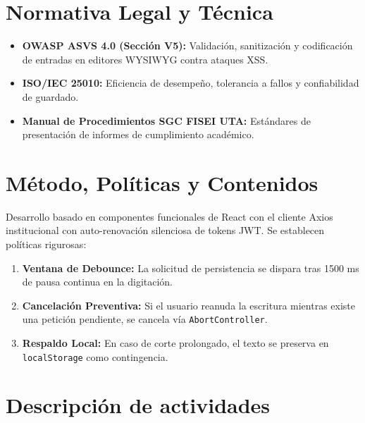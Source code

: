 \documentclass[12pt,a4paper]{article}
\begin{document}
\section{Normativa Legal y Técnica}
\begin{itemize}[leftmargin=1.5em, itemsep=2pt]
    \item \textbf{OWASP ASVS 4.0 (Sección V5):} Validación, sanitización y codificación de entradas en editores WYSIWYG contra ataques XSS.
    \item \textbf{ISO/IEC 25010:} Eficiencia de desempeño, tolerancia a fallos y confiabilidad de guardado.
    \item \textbf{Manual de Procedimientos SGC FISEI UTA:} Estándares de presentación de informes de cumplimiento académico.
\end{itemize}

\section{Método, Políticas y Contenidos}
Desarrollo basado en componentes funcionales de React con el cliente Axios institucional con auto-renovación silenciosa de tokens JWT. Se establecen políticas rigurosas:
\begin{enumerate}[leftmargin=1.5em, itemsep=1.5pt]
    \item \textbf{Ventana de Debounce:} La solicitud de persistencia se dispara tras 1500 ms de pausa continua en la digitación.
    \item \textbf{Cancelación Preventiva:} Si el usuario reanuda la escritura mientras existe una petición pendiente, se cancela vía \texttt{AbortController}.
    \item \textbf{Respaldo Local:} En caso de corte prolongado, el texto se preserva en \texttt{localStorage} como contingencia.
\end{enumerate}

\section{Descripción de actividades}
\end{document}
